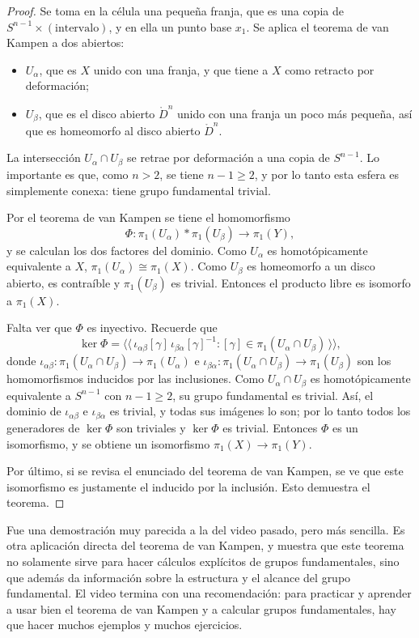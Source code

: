 \documentclass[11pt]{article}
\begin{document}
\begin{proof}
Se toma en la célula una pequeña franja, que es una copia de $S^{n-1}\times(\text{intervalo})$, y en ella un punto base $x_1$. Se aplica el teorema de van Kampen a dos abiertos:
\begin{itemize}
  \item $U_\alpha$, que es $X$ unido con una franja, y que tiene a $X$ como retracto por deformación;
  \item $U_\beta$, que es el disco abierto $\mathring{D}^n$ unido con una franja un poco más pequeña, así que es homeomorfo al disco abierto $\mathring{D}^n$.
\end{itemize}
La intersección $U_\alpha\cap U_\beta$ se retrae por deformación a una copia de $S^{n-1}$. Lo importante es que, como $n>2$, se tiene $n-1\geq 2$, y por lo tanto esta esfera es simplemente conexa: tiene grupo fundamental trivial.

Por el teorema de van Kampen se tiene el homomorfismo
\[
  \Phi\colon\pi_1(U_\alpha)*\pi_1(U_\beta)\to\pi_1(Y),
\]
y se calculan los dos factores del dominio. Como $U_\alpha$ es homotópicamente equivalente a $X$, $\pi_1(U_\alpha)\cong\pi_1(X)$. Como $U_\beta$ es homeomorfo a un disco abierto, es contraíble y $\pi_1(U_\beta)$ es trivial. Entonces el producto libre es isomorfo a $\pi_1(X)$.

Falta ver que $\Phi$ es inyectivo. Recuerde que
\[
  \ker\Phi=\bigl\langle\!\bigl\langle\, \iota_{\alpha\beta}[\gamma]\,\iota_{\beta\alpha}[\gamma]^{-1} : [\gamma]\in\pi_1(U_\alpha\cap U_\beta)\,\bigr\rangle\!\bigr\rangle,
\]
donde $\iota_{\alpha\beta}\colon\pi_1(U_\alpha\cap U_\beta)\to\pi_1(U_\alpha)$ e $\iota_{\beta\alpha}\colon\pi_1(U_\alpha\cap U_\beta)\to\pi_1(U_\beta)$ son los homomorfismos inducidos por las inclusiones. Como $U_\alpha\cap U_\beta$ es homotópicamente equivalente a $S^{n-1}$ con $n-1\geq 2$, su grupo fundamental es trivial. Así, el dominio de $\iota_{\alpha\beta}$ e $\iota_{\beta\alpha}$ es trivial, y todas sus imágenes lo son; por lo tanto todos los generadores de $\ker\Phi$ son triviales y $\ker\Phi$ es trivial. Entonces $\Phi$ es un isomorfismo, y se obtiene un isomorfismo $\pi_1(X)\to\pi_1(Y)$.

Por último, si se revisa el enunciado del teorema de van Kampen, se ve que este isomorfismo es justamente el inducido por la inclusión. Esto demuestra el teorema.
\end{proof}

Fue una demostración muy parecida a la del video pasado, pero más sencilla. Es otra aplicación directa del teorema de van Kampen, y muestra que este teorema no solamente sirve para hacer cálculos explícitos de grupos fundamentales, sino que además da información sobre la estructura y el alcance del grupo fundamental. El video termina con una recomendación: para practicar y aprender a usar bien el teorema de van Kampen y a calcular grupos fundamentales, hay que hacer muchos ejemplos y muchos ejercicios.
\end{document}
